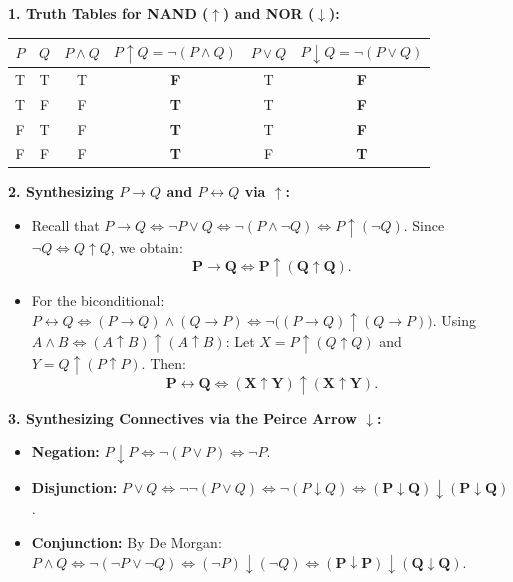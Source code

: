 \begin{tabletworkspace}[5.0cm]
\end{tabletworkspace}

\begin{solution}
\textbf{1. Truth Tables for NAND ($\uparrow$) and NOR ($\downarrow$):}
\begin{center}
\begin{tabular}{cc|c|c|c|c}
\toprule
$P$ & $Q$ & $P \land Q$ & $P \uparrow Q = \neg(P \land Q)$ & $P \lor Q$ & $P \downarrow Q = \neg(P \lor Q)$ \\
\midrule
T & T & T & \textbf{F} & T & \textbf{F} \\
T & F & F & \textbf{T} & T & \textbf{F} \\
F & T & F & \textbf{T} & T & \textbf{F} \\
F & F & F & \textbf{T} & F & \textbf{T} \\
\bottomrule
\end{tabular}
\end{center}

\textbf{2. Synthesizing $P \to Q$ and $P \leftrightarrow Q$ via $\uparrow$:}
\begin{itemize}[leftmargin=1.4em,itemsep=2pt]
  \item Recall that $P \to Q \iff \neg P \lor Q \iff \neg(P \land \neg Q) \iff P \uparrow (\neg Q)$.
  Since $\neg Q \iff Q \uparrow Q$, we obtain:
  \[
  \mathbf{P \to Q \iff P \uparrow (Q \uparrow Q)}.
  \]
  \item For the biconditional: $P \leftrightarrow Q \iff (P \to Q) \land (Q \to P) \iff \neg\bigl((P \to Q) \uparrow (Q \to P)\bigr)$.
  Using $A \land B \iff (A \uparrow B) \uparrow (A \uparrow B)$:
  Let $X = P \uparrow (Q \uparrow Q)$ and $Y = Q \uparrow (P \uparrow P)$. Then:
  \[
  \mathbf{P \leftrightarrow Q \iff (X \uparrow Y) \uparrow (X \uparrow Y)}.
  \]
\end{itemize}

\textbf{3. Synthesizing Connectives via the Peirce Arrow $\downarrow$:}
\begin{itemize}[leftmargin=1.4em,itemsep=2pt]
  \item \textbf{Negation:} $P \downarrow P \iff \neg(P \lor P) \iff \neg P$.
  \item \textbf{Disjunction:} $P \lor Q \iff \neg\neg(P \lor Q) \iff \neg(P \downarrow Q) \iff \mathbf{(P \downarrow Q) \downarrow (P \downarrow Q)}$.
  \item \textbf{Conjunction:} By De Morgan: $P \land Q \iff \neg(\neg P \lor \neg Q) \iff (\neg P) \downarrow (\neg Q) \iff \mathbf{(P \downarrow P) \downarrow (Q \downarrow Q)}$.
\end{itemize}


\end{solution}
